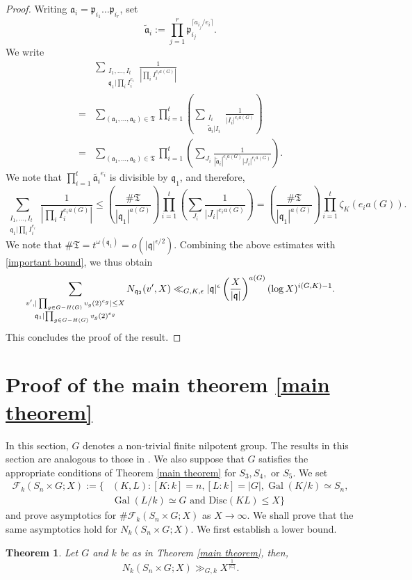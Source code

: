 \documentclass[11pt]{amsart}
\newtheorem{theorem}{Theorem}[section]
\newcommand{\fq}{\mathfrak{q}}
\newcommand{\fp}{\mathfrak{p}}
\newcommand{\disc}{\mathrm{Disc}}
\newcommand{\op}[1]{\operatorname{#1}}
\numberwithin{equation}{section}
\begin{document}
\begin{proof}
     Writing $\mathfrak{a}_i=\fp_{i_1}\dots \fp_{i_r}$, set \[\widetilde{\mathfrak{a}}_i:=\prod_{j=1}^r \fp_{i_j}^{\lceil a_{i_j}/e_i\rceil}.\] 
    We write
    \[\begin{split}& \sum_{\substack{I_1, \dots, I_{t}\\  \fq_1| \prod_i I_i^{e_i}}} \frac{1}{|\prod_i I_i^{e_i a(G)}|} \\
    = & \sum_{(\mathfrak{a}_1, \dots, \mathfrak{a}_k)\in \mathfrak{T}}\prod_{i=1}^t \left(\sum_{\substack{I_i \\ \widetilde{\mathfrak{a}}_i|I_i}}\frac{1}{| I_i|^{e_i a(G)}}\right)\\ =& \sum_{(\mathfrak{a}_1, \dots, \mathfrak{a}_k)\in \mathfrak{T}}\prod_{i=1}^t \left(\sum_{J_i}\frac{1}{|\widetilde{\mathfrak{a}}_i|^{e_i a(G)} |J_i|^{e_i a(G)}}\right).\end{split}\]
   We note that $\prod_{i=1}^t \widetilde{\mathfrak{a}_i}^{e_i}$ is divisible by $\fq_1$, and therefore, 
   \[\sum_{\substack{I_1, \dots, I_{t}\\  \fq_1| \prod_i I_i^{e_i}}} \frac{1}{|\prod_i I_i^{e_i a(G)}|} \leq \left(\frac{\# \mathfrak{T}}{|\fq_1|^{a(G)}}\right)\prod_{i=1}^t \left(\sum_{J_i}\frac{1}{|J_i|^{e_i a(G)}}\right)=\left(\frac{\# \mathfrak{T}}{|\fq_1|^{a(G)}}\right)\prod_{i=1}^t \zeta_K(e_i a(G)).\]
   We note that $\#\mathfrak{T}=t^{\omega(\fq_1)}=o(|\fq|^{\epsilon/2})$. 
    Combining the above estimates with \eqref{important bound}, we thus obtain
    \[
    \sum_{\substack{v',|\prod_{g \in G-H(G)}v_g(2)^{e_g}|\leq X\\ \fq_1 \mid \prod_{g \in G-H(G)}v_g(2)^{e_g}}}N_{\fq_2}(v',X) \\
    \ll_{G,K,\epsilon} |\fq|^{\epsilon}\left(\frac{X}{|\fq|}\right)^{a(G)}(\log X)^{i(G,K)-1}.
    \]
    This concludes the proof of the result.
\end{proof}


\section{Proof of the main theorem \ref{main theorem}}\label{s 4}
In this section, $G$ denotes a non-trivial finite nilpotent group. The results in this section are analogous to those in \cite[Section 5]{Wang2020}. We also suppose that $G$ satisfies the appropriate conditions of Theorem \ref{main theorem} for $S_3, S_4,$ or $S_5$. We set 
\[
\begin{split} \mathcal{F}_{k}(S_n\times G; X):=\{ & (K,L) : [K:k]= n, [L:k] = |G|, \op{Gal}(K/k) \simeq S_n, \\ &  \op{Gal}(L/k) \simeq G \text{ and } \disc(KL) \leq X\}
\end{split}
\]
and prove asymptotics for $\# \mathcal{F}_{k}(S_n\times G; X)$ as $X\rightarrow \infty$. We shall prove that the same asymptotics hold for $N_k(S_n\times G; X)$. We first establish a lower bound.
\begin{theorem}\label{lower bound theorem}
    Let $G$ and $k$ be as in Theorem \ref{main theorem}, then, 
    \[  N_{k}(S_n\times G; X) \gg_{G, k} X^{\frac{1}{|G|}}.\]
\end{theorem}
\end{document}
